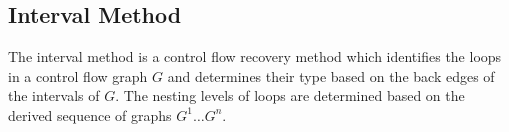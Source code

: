 
\subsection{Interval Method}


The interval method is a control flow recovery method which identifies the loops in a control flow graph $G$ and determines their type based on the back edges of the intervals of $G$. The nesting levels of loops are determined based on the derived sequence of graphs $G^1 \dots G^n$.

